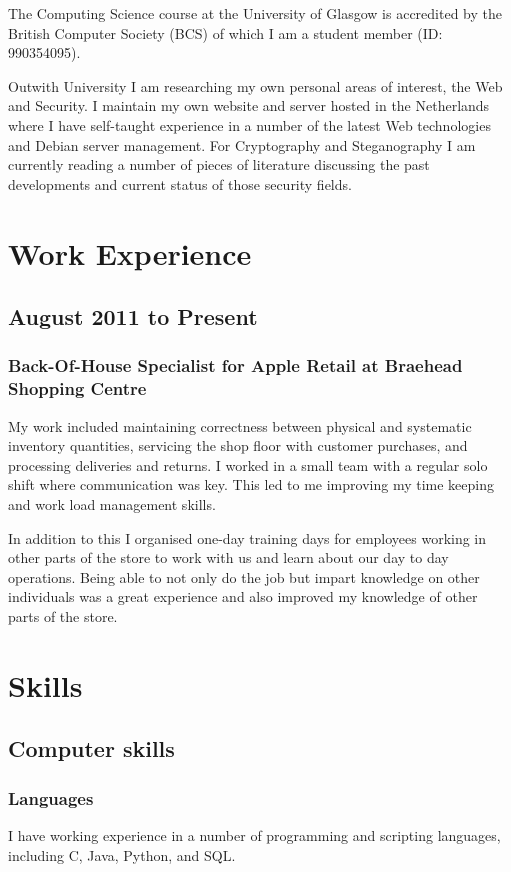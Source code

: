 \documentclass[11pt,a4paper]{article}
\begin{document}
The Computing Science course at the University of Glasgow is accredited by the
British Computer Society (BCS) of which I am a student member (ID: 990354095).

Outwith University I am researching my own personal areas of interest, the
Web and Security. I maintain my own website and server hosted in the
Netherlands where I have self-taught experience in a number of the latest Web
technologies and Debian server management. For Cryptography and Steganography
I am currently reading a number of pieces of literature discussing the past
developments and current status of those security fields.
\section*{Work Experience}
\subsection*{August 2011 to Present}
\subsubsection*{Back-Of-House Specialist for Apple Retail at Braehead 
Shopping Centre}
My work included maintaining correctness between physical and systematic 
inventory quantities, servicing the shop floor with customer purchases, and 
processing deliveries and returns. I worked in a small team with a regular 
solo shift where communication was key. This led to me improving my time 
keeping and work load management skills.

In addition to this I organised one-day training days for employees working in 
other parts of the store to work with us and learn about our day to day 
operations. Being able to not only do the job but impart knowledge on other 
individuals was a great experience and also improved my knowledge of other 
parts of the store.
\section*{Skills}
\subsection*{Computer skills}
\subsubsection*{Languages}
I have working experience in a number of programming and scripting languages,
including C, Java, Python, and SQL.
\end{document}
